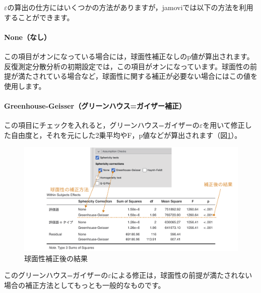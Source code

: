 \documentclass[
  12pt,
  a5jpaper,
  lualatex, ja=standard]{bxjsbook}
\begin{document}
\(\varepsilon\)の算出の仕方にはいくつかの方法がありますが，jamoviでは以下の方法を利用することができます。

\hypertarget{noneux306aux3057}{%
\paragraph*{None（なし）}\label{noneux306aux3057}}

この項目がオンになっている場合には，球面性補正なしのp値が算出されます。反復測定分散分析の初期設定では，この項目がオンになっています。球面性の前提が満たされている場合など，球面性に関する補正が必要ない場合にはこの値を使用します。

\hypertarget{greenhouse-geisserux30b0ux30eaux30fcux30f3ux30cfux30a6ux30b9ux30acux30a4ux30b6ux30fcux88dcux6b63}{%
\paragraph*{Greenhouse-Geisser（グリーンハウス=ガイザー補正）}\label{greenhouse-geisserux30b0ux30eaux30fcux30f3ux30cfux30a6ux30b9ux30acux30a4ux30b6ux30fcux88dcux6b63}}

この項目にチェックを入れると，グリーンハウス=ガイザーの\(\varepsilon\)を用いて修正した自由度と，それを元にした2乗平均やF，p値などが算出されます（図\ref{fig:ANOVA-rm-greenhouse}）。

\begin{figure}[!ht]

{\centering \includegraphics[width=1\linewidth]{images/ANOVA/rm-greenhouse} 

}

\caption{球面性補正後の結果}\label{fig:ANOVA-rm-greenhouse}
\end{figure}

このグリーンハウス=ガイザーの\(\varepsilon\)による修正は，球面性の前提が満たされない場合の補正方法としてもっとも一般的なものです。
\end{document}
